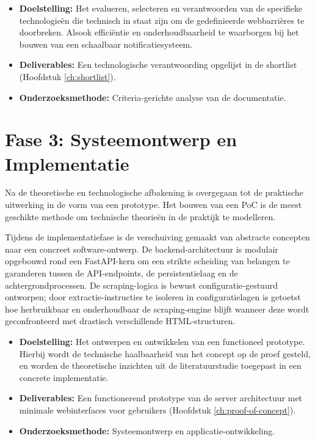 \begin{itemize}
    \item \textbf{Doelstelling:} Het evalueren, selecteren en verantwoorden van de specifieke technologieën die technisch in staat zijn om de gedefinieerde webbarrières te doorbreken. Alsook efficiëntie en onderhoudbaarheid te waarborgen bij het bouwen van een schaalbaar notificatiesysteem.
    \item \textbf{Deliverables:} Een technologische verantwoording opgelijst in de shortlist (Hoofdstuk \ref{ch:shortlist}).
    \item \textbf{Onderzoeksmethode:} Criteria-gerichte analyse van de documentatie.
\end{itemize}

\section{Fase 3: Systeemontwerp en Implementatie}
Na de theoretische en technologische afbakening is overgegaan tot de praktische uitwerking in de vorm van een prototype. 
Het bouwen van een \gls{PoC} is de meest geschikte methode om technische theorieën in de praktijk te modelleren.

Tijdens de implementatiefase is de verschuiving gemaakt van abstracte concepten naar een concreet software-ontwerp. 
De backend-architectuur is modulair opgebouwd rond een FastAPI-kern om een strikte scheiding van belangen te garanderen tussen de API-endpoints, 
de persistentielaag en de achtergrondprocessen. De scraping-logica is bewust configuratie-gestuurd ontworpen; 
door extractie-instructies te isoleren in configuratielagen is getoetst hoe herbruikbaar en onderhoudbaar de scraping-engine blijft wanneer deze wordt geconfronteerd met drastisch verschillende HTML-structuren.

\begin{itemize}
    \item \textbf{Doelstelling:} Het ontwerpen en ontwikkelen van een functioneel prototype. Hierbij wordt de technische haalbaarheid van het concept op de proef gesteld, en worden de theoretische inzichten uit de literatuurstudie toegepast in een concrete implementatie.
    \item \textbf{Deliverables:} Een functionerend prototype van de server architectuur met minimale webinterfaces voor gebruikers (Hoofdstuk \ref{ch:proof-of-concept}).
    \item \textbf{Onderzoeksmethode:} Systeemontwerp en applicatie-ontwikkeling.
\end{itemize}

